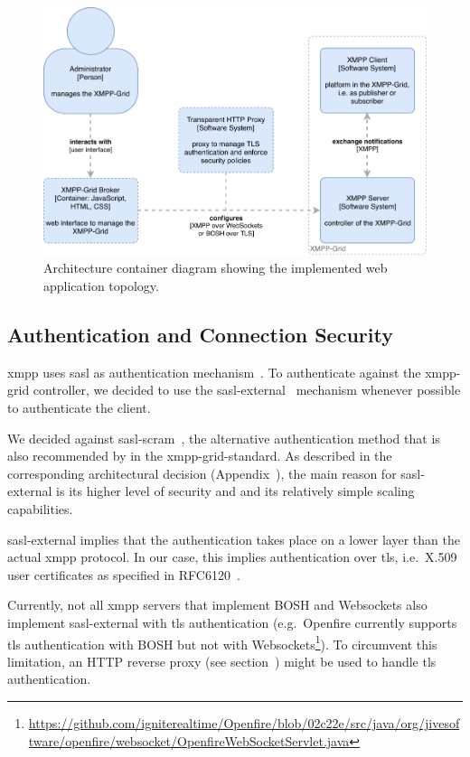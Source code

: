 \begin{figure}[H]
    \centering
    \includegraphics[width=\linewidth]{resources/architecture_container_webapplication_with_http_proxy}
    \caption[Architecture container diagram: Web application with proxy]{Architecture container diagram showing the implemented web application topology.}
    \label{fig:architecturecontainerweb-http-proxy}
\end{figure}
  

\subsection{Authentication and Connection Security}\label{sec:authentication-and-connection-security}

\gls{xmpp} uses \gls{sasl} as authentication mechanism~\cite{rfc6120}.
To authenticate against the \gls{xmpp-grid} \gls{controller}, we decided to use the \gls{sasl-external}~\cite{rfc4422} mechanism whenever possible to authenticate the client.

We decided against \gls{sasl-scram}~\cite{rfc7677}, the alternative authentication method that is also recommended by in the \gls{xmpp-grid-standard}.
As described in the corresponding architectural decision (Appendix~), the main reason for \gls{sasl-external} is its higher level of security and and its relatively simple scaling capabilities.

\gls{sasl-external} implies that the authentication takes place on a lower layer than the actual \gls{xmpp} protocol. In our case, this implies authentication over \gls{tls}, i.e.~X.509 user certificates as specified in RFC6120~\cite{rfc6120}.

Currently, not all \gls{xmpp} servers that implement BOSH and Websockets also implement \gls{sasl-external} with \gls{tls} authentication
(e.g.\ Openfire currently supports \gls{tls} authentication with BOSH but not with Websockets\footnote{\url{https://github.com/igniterealtime/Openfire/blob/02c22e/src/java/org/jivesoftware/openfire/websocket/OpenfireWebSocketServlet.java}}).
To circumvent this limitation, an HTTP reverse proxy (see section~) might be used to handle \gls{tls} authentication.

